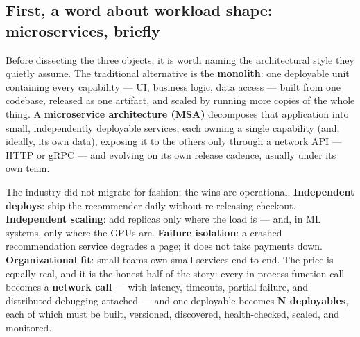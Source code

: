 \subsection*{First, a word about workload shape: microservices, briefly}

Before dissecting the three objects, it is worth naming the architectural style they quietly assume. The traditional alternative is the \textbf{monolith}: one deployable unit containing every capability — UI, business logic, data access — built from one codebase, released as one artifact, and scaled by running more copies of the whole thing. A \textbf{microservice architecture (MSA)} decomposes that application into small, independently deployable services, each owning a single capability (and, ideally, its own data), exposing it to the others only through a network API — HTTP or gRPC — and evolving on its own release cadence, usually under its own team.

The industry did not migrate for fashion; the wins are operational. \textbf{Independent deploys}: ship the recommender daily without re-releasing checkout. \textbf{Independent scaling}: add replicas only where the load is — and, in ML systems, only where the GPUs are. \textbf{Failure isolation}: a crashed recommendation service degrades a page; it does not take payments down. \textbf{Organizational fit}: small teams own small services end to end. The price is equally real, and it is the honest half of the story: every in-process function call becomes a \textbf{network call} — with latency, timeouts, partial failure, and distributed debugging attached — and one deployable becomes \textbf{N deployables}, each of which must be built, versioned, discovered, health-checked, scaled, and monitored.

